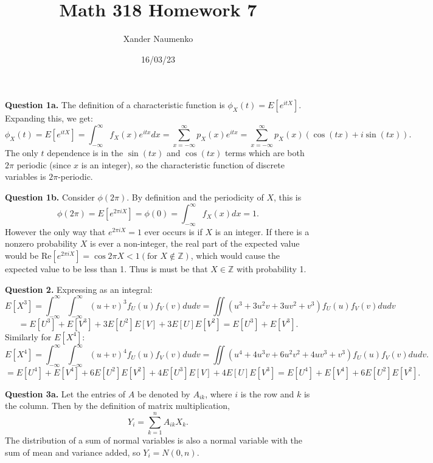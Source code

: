 \documentclass[letterpaper, reqno,11pt]{article}
\begin{document}
\title{Math 318 Homework 7}
\date{16/03/23}
\author{Xander Naumenko}
\maketitle

{\medskip\noindent\bf Question 1a.} The definition of a characteristic function is $\phi_{X}(t)=E[e^{itX}]$. Expanding this, we get: 
\[
\phi_{X}(t)=E[e^{itX}]=\int_{-\infty}^{\infty}f_X(x) e^{itx}dx=\sum_{x=-\infty}^{\infty}p_X(x) e^{itx}=\sum_{x=-\infty}^{\infty}p_X(x) \left( \cos(tx)+i\sin(tx) \right) 
.\]
The only $t$ dependence is in the $\sin(tx)$ and $\cos(tx)$ terms which are both $2\pi$ periodic (since $x$ is an integer), so the characteristic function of discrete variables is $2\pi$-periodic. 



{\medskip\noindent\bf Question 1b.} Consider $\phi(2\pi)$. By definition and the periodicity of $X$, this is
\[
    \phi(2\pi)=E[e^{2\pi iX}]=\phi(0)=\int_{-\infty}^{\infty}f_X(x)dx=1
.\]
However the only way that $e^{2\pi iX}=1$ ever occurs is if $X$ is an integer. If there is a nonzero probability $X$ is ever a non-integer, the real part of the expected value would be $\text{Re}[e^{2\pi iX}]=\cos 2\pi X<1(\text{for } X \not\in \mathbb{Z})$, which would cause the expected value to be less than 1. Thus is must be that $X\in\mathbb{Z}$ with probability 1. 

{\medskip\noindent\bf Question 2.} Expressing as an integral: 
\[
    E[X^3]=\int_{-\infty}^{\infty}\int_{-\infty}^{\infty}(u+v)^3f_U(u)f_V(v)dudv=\iint (u^3+3u^2v+3uv^2+v^3)f_U(u)f_V(v)dudv
\]
\[
    =E[U^3]+E[V^3]+3E[U^2]E[V]+3E[U]E[V^2]=E[U^3]+E[V^3]
.\]
Similarly for $E[X^{4}]$: 
\[
    E[X^4]=\int_{-\infty}^{\infty}\int_{-\infty}^{\infty}(u+v)^4f_U(u)f_V(v)dudv=\iint (u^4+4u^3v+6u^2v^2+4uv^3+v^3)f_U(u)f_V(v)dudv
.\]
\[
    =E[U^4]+E[V^4]+6E[U^2]E[V^2]+4E[U^3]E[V]+4E[U]E[V^3]=E[U^4]+E[V^4]+6E[U^2]E[V^2]
.\]

{\medskip\noindent\bf Question 3a.} Let the entries of $A$ be denoted by $A_{ik}$, where $i$ is the row and $k$ is the column. Then by the definition of matrix multiplication,
\[
    Y_i=\sum_{k=1}^{n}A_{ik}X_k
.\]
The distribution of a sum of normal variables is also a normal variable with the sum of mean and variance added, so $Y_i=N(0,n)$. 
\end{document}
